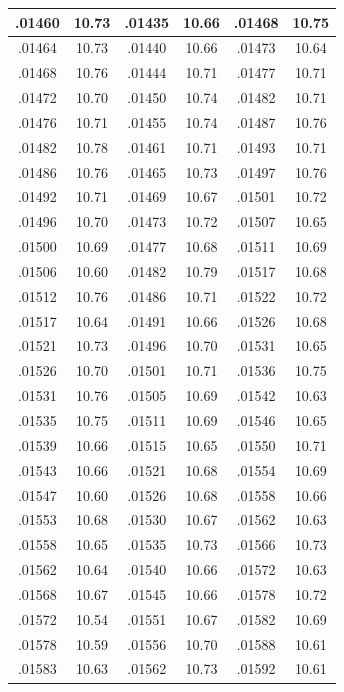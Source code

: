 \documentclass[10pt,twoside]{report}
\begin{document}
\begin{appendices}
\begin{longtable}{|c|c||c|c||c|c|}
.01460 & 10.73 & .01435 & 10.66 & .01468 & 10.75\\\hline
.01464 & 10.73 & .01440 & 10.66 & .01473 & 10.64\\\hline
.01468 & 10.76 & .01444 & 10.71 & .01477 & 10.71\\\hline
.01472 & 10.70 & .01450 & 10.74 & .01482 & 10.71\\\hline
.01476 & 10.71 & .01455 & 10.74 & .01487 & 10.76\\\hline
.01482 & 10.78 & .01461 & 10.71 & .01493 & 10.71\\\hline
.01486 & 10.76 & .01465 & 10.73 & .01497 & 10.76\\\hline
.01492 & 10.71 & .01469 & 10.67 & .01501 & 10.72\\\hline
.01496 & 10.70 & .01473 & 10.72 & .01507 & 10.65\\\hline
.01500 & 10.69 & .01477 & 10.68 & .01511 & 10.69\\\hline
.01506 & 10.60 & .01482 & 10.79 & .01517 & 10.68\\\hline
.01512 & 10.76 & .01486 & 10.71 & .01522 & 10.72\\\hline
.01517 & 10.64 & .01491 & 10.66 & .01526 & 10.68\\\hline
.01521 & 10.73 & .01496 & 10.70 & .01531 & 10.65\\\hline
.01526 & 10.70 & .01501 & 10.71 & .01536 & 10.75\\\hline
.01531 & 10.76 & .01505 & 10.69 & .01542 & 10.63\\\hline
.01535 & 10.75 & .01511 & 10.69 & .01546 & 10.65\\\hline
.01539 & 10.66 & .01515 & 10.65 & .01550 & 10.71\\\hline
.01543 & 10.66 & .01521 & 10.68 & .01554 & 10.69\\\hline
.01547 & 10.60 & .01526 & 10.68 & .01558 & 10.66\\\hline
.01553 & 10.68 & .01530 & 10.67 & .01562 & 10.63\\\hline
.01558 & 10.65 & .01535 & 10.73 & .01566 & 10.73\\\hline
.01562 & 10.64 & .01540 & 10.66 & .01572 & 10.63\\\hline
.01568 & 10.67 & .01545 & 10.66 & .01578 & 10.72\\\hline
.01572 & 10.54 & .01551 & 10.67 & .01582 & 10.69\\\hline
.01578 & 10.59 & .01556 & 10.70 & .01588 & 10.61\\\hline
.01583 & 10.63 & .01562 & 10.73 & .01592 & 10.61\\\hline

\end{longtable}
\end{appendices}
\end{document}
